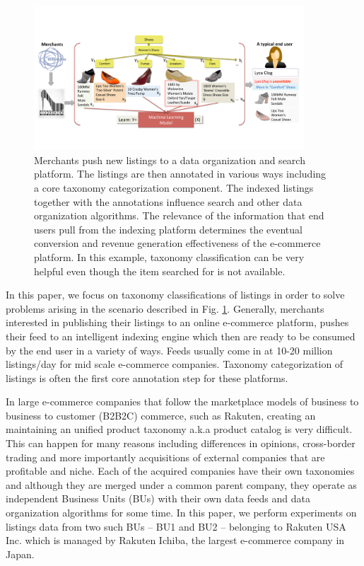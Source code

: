 \begin{figure}[ht]
	\centering
	\includegraphics[width=0.9\textwidth]{images/push-pull}
	\vspace{-0.2cm}
	\caption{{\small Merchants push new listings to a data organization and search platform. The listings are then annotated in various ways including a core taxonomy categorization component. The indexed listings together with the annotations influence search and other data organization algorithms. The relevance of the information that end users pull from the indexing platform determines the eventual conversion and revenue generation effectiveness of the e-commerce platform. In this example, taxonomy classification can be very helpful even though the item searched for is not available.}}
	\label{Fig:push-pull}
\end{figure}
\vspace{-0.5cm}

In this paper, we focus on taxonomy classifications of listings in order to solve problems arising in the scenario described in Fig. \ref{Fig:push-pull}.
Generally, merchants interested in publishing their listings to an online e-commerce platform, pushes their feed to an intelligent indexing engine which then are ready to be consumed by the end user in a variety of ways.
Feeds usually come in at 10-20 million listings/day for mid scale e-commerce companies.
Taxonomy categorization of listings is often the first core annotation step for these platforms.

In large e-commerce companies that follow the marketplace models of business to business to customer (B2B2C) commerce, such as Rakuten, creating an maintaining an unified product taxonomy a.k.a product catalog is very difficult. 
This can happen for many reasons including differences in opinions, cross-border trading and more importantly acquisitions of external companies that are profitable and niche.
Each of the acquired companies have their own taxonomies and although they are merged under a common parent company, they operate as independent Business Units (BUs) with their own data feeds and data organization algorithms for some time.
In this paper, we perform experiments on listings data from two such BUs -- BU1 and BU2 -- belonging to Rakuten USA Inc.
which is managed by Rakuten Ichiba, the largest e-commerce company in Japan.

